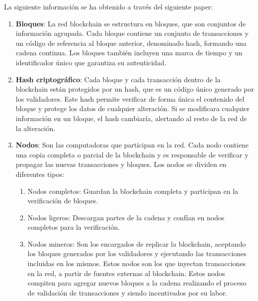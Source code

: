 La siguiente información se ha obtenido a través del siguiente paper: 
\citetitle{[5]}~\cite{[5]}

\begin{enumerate}
    \item \textbf{Bloques}: La red \gls{blockchain} se estructura en bloques, que son conjuntos de 
    información agrupada. Cada bloque contiene un conjunto de transacciones y un código de referencia 
    al bloque anterior, denominado \gls{hash}, formando una cadena continua. Los bloques también incluyen una
    marca de tiempo y un identificador único que garantiza su autenticidad.

    \item \textbf{Hash criptográfico}: Cada bloque y cada transacción dentro de la blockchain están protegidos por un \gls{hash}, que es un código único generado por los validadores.
    Este hash permite verificar de forma única el contenido del bloque y protege 
    los datos de cualquier alteración. 
    Si se modificara cualquier información en un bloque, el \gls{hash} cambiaría, alertando al 
    resto de la red de la alteración.
    
    \item \textbf{Nodos}: Son las computadoras que participan en la red. Cada nodo contiene una copia 
    completa o parcial de la \gls{blockchain} y es responsable de verificar y propagar las nuevas transacciones y
    bloques. Los nodos se dividen en diferentes tipos:
    \begin{enumerate}
        \item Nodos completos: Guardan la \gls{blockchain} completa y participan en la verificación de bloques.
        \item Nodos ligeros: Descargan partes de la cadena y confían en nodos completos para la verificación.
        \item Nodos mineros: Son los encargados de replicar la blockchain, aceptando los bloques
            generados por los validadores y ejecutando las transacciones incluidas en los mismos. Estos nodos son
            los que inyectan transacciones en la red, a partir de fuentes externas al blockchain.
            Estos nodos compiten para agregar nuevos bloques a la cadena realizando el proceso de validación de 
            transacciones y siendo incentivados por su labor.
    \end{enumerate} 
     

\end{enumerate}
